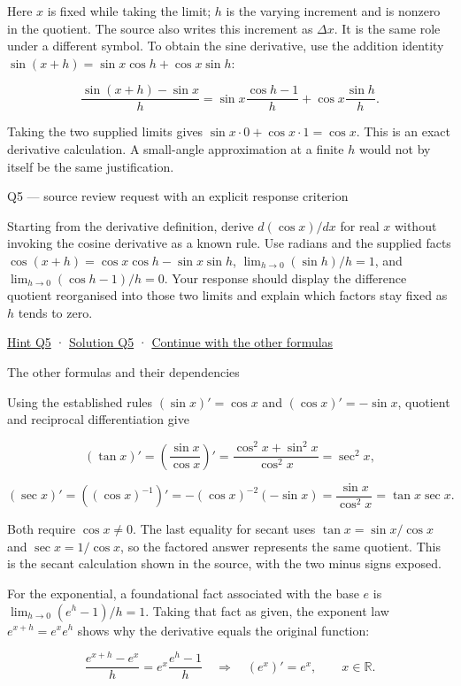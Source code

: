 \documentclass[
  11pt,
]{article}
\begin{document}
Here \(x\) is fixed while taking the limit; \(h\) is the varying
increment and is nonzero in the quotient. The source also writes this
increment as \(\Delta x\). It is the same role under a different symbol.
To obtain the sine derivative, use the addition identity
\(\sin(x+h)=\sin x\cos h+\cos x\sin h\):

\[\frac{\sin(x+h)-\sin x}{h}
=\sin x\frac{\cos h-1}{h}+\cos x\frac{\sin h}{h}.\]

Taking the two supplied limits gives
\(\sin x\cdot0+\cos x\cdot1=\cos x\). This is an exact derivative
calculation. A small-angle approximation at a finite \(h\) would not by
itself be the same justification.

Q5 --- source review request with an explicit response criterion

Starting from the derivative definition, derive \(d(\cos x)/dx\) for
real \(x\) without invoking the cosine derivative as a known rule. Use
radians and the supplied facts \(\cos(x+h)=\cos x\cos h-\sin x\sin h\),
\(\lim_{h\to0}(\sin h)/h=1\), and \(\lim_{h\to0}(\cos h-1)/h=0\). Your
response should display the difference quotient reorganised into those
two limits and explain which factors stay fixed as \(h\) tends to zero.

\protect\hyperlink{hint-q5}{Hint Q5} ·
\protect\hyperlink{solution-q5}{Solution Q5} ·
\protect\hyperlink{other-formulas}{Continue with the other formulas}

The other formulas and their dependencies

Using the established rules \((\sin x)'=\cos x\) and
\((\cos x)'=-\sin x\), quotient and reciprocal differentiation give

\[(\tan x)'=\left(\frac{\sin x}{\cos x}\right)'
=\frac{\cos^2x+\sin^2x}{\cos^2x}=\sec^2x,\]

\[(\sec x)'=((\cos x)^{-1})'
=-(\cos x)^{-2}(-\sin x)
=\frac{\sin x}{\cos^2x}=\tan x\sec x.\]

Both require \(\cos x\ne0\). The last equality for secant uses
\(\tan x=\sin x/\cos x\) and \(\sec x=1/\cos x\), so the factored answer
represents the same quotient. This is the secant calculation shown in
the source, with the two minus signs exposed.

For the exponential, a foundational fact associated with the base \(e\)
is \(\lim_{h\to0}(e^h-1)/h=1\). Taking that fact as given, the exponent
law \(e^{x+h}=e^xe^h\) shows why the derivative equals the original
function:

\[\frac{e^{x+h}-e^x}{h}=e^x\frac{e^h-1}{h}
\quad\Longrightarrow\quad
(e^x)'=e^x,\qquad x\in\mathbb R.\]
\end{document}
